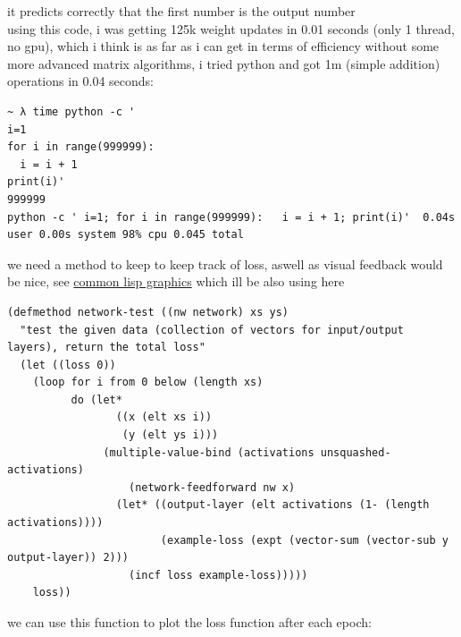 \documentclass[a4paper,12pt]{article}
\begin{document}
it predicts correctly that the first number is the output number\\
using this code, i was getting 125k weight updates in 0.01 seconds (only 1 thread, no gpu), which i think is as far as i can get in terms of efficiency without some more advanced matrix algorithms, i tried python and got 1m (simple addition) operations in 0.04 seconds:\\
\lstset{language=bash,label= ,caption= ,captionpos=b,numbers=none}
\begin{lstlisting}
~ λ time python -c '
i=1
for i in range(999999):
  i = i + 1
print(i)'
999999
python -c ' i=1; for i in range(999999):   i = i + 1; print(i)'  0.04s user 0.00s system 98% cpu 0.045 total
\end{lstlisting}
we need  a method to keep to keep track of loss, aswell as visual feedback would be nice, see \href{20230521163611-common_lisp_sdl2.org}{common lisp graphics} which ill be also using here\\
\lstset{language=Lisp,label= ,caption= ,captionpos=b,numbers=none}
\begin{lstlisting}
(defmethod network-test ((nw network) xs ys)
  "test the given data (collection of vectors for input/output layers), return the total loss"
  (let ((loss 0))
    (loop for i from 0 below (length xs)
          do (let*
                 ((x (elt xs i))
                  (y (elt ys i)))
               (multiple-value-bind (activations unsquashed-activations)
                   (network-feedforward nw x)
                 (let* ((output-layer (elt activations (1- (length activations))))
                        (example-loss (expt (vector-sum (vector-sub y output-layer)) 2)))
                   (incf loss example-loss)))))
    loss))
\end{lstlisting}
we can use this function to plot the loss function after each epoch:\\
\lstset{language=Lisp,label= ,caption= ,captionpos=b,numbers=none}
\end{document}
